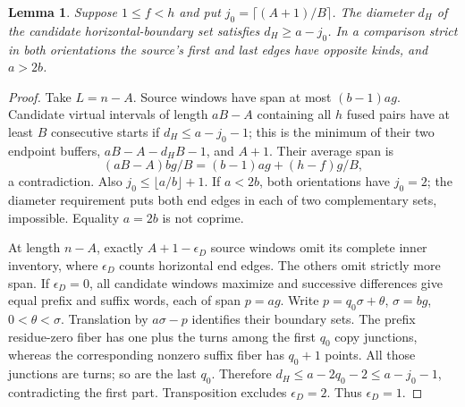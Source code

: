 \documentclass[11pt,a4paper]{amsart}
\numberwithin{equation}{section}
\theoremstyle{plain}
\newtheorem{lemma}[theorem]{Lemma}
\theoremstyle{definition}
\begin{document}
\begin{lemma}\label{lem:end-spread}
Suppose \(1\le f<h\) and put \(j_0=\lceil(A+1)/B\rceil\).  The diameter \(d_H\) of the candidate horizontal-boundary set satisfies \(d_H\ge a-j_0\).  In a comparison strict in both orientations the source's first and last edges have opposite kinds, and \(a>2b\).
\end{lemma}
\begin{proof}
Take \(L=n-A\).  Source windows have span at most \((b-1)ag\).  Candidate virtual intervals of length \(aB-A\) containing all \(h\) fused pairs have at least \(B\) consecutive starts if \(d_H\le a-j_0-1\); this is the minimum of their two endpoint buffers, \(aB-A-d_HB-1\), and \(A+1\).  Their average span is
\[
 (aB-A)bg/B=(b-1)ag+(h-f)g/B,
\]
a contradiction.  Also \(j_0\le\lfloor a/b\rfloor+1\).  If \(a<2b\), both orientations have \(j_0=2\); the diameter requirement puts both end edges in each of two complementary sets, impossible.  Equality \(a=2b\) is not coprime.

At length \(n-A\), exactly \(A+1-\epsilon_D\) source windows omit its complete inner inventory, where \(\epsilon_D\) counts horizontal end edges.  The others omit strictly more span.  If \(\epsilon_D=0\), all candidate windows maximize and successive differences give equal prefix and suffix words, each of span \(p=ag\).  Write \(p=q_0\sigma+\theta\), \(\sigma=bg\), \(0<\theta<\sigma\).  Translation by \(a\sigma-p\) identifies their boundary sets.  The prefix residue-zero fiber has one plus the turns among the first \(q_0\) copy junctions, whereas the corresponding nonzero suffix fiber has \(q_0+1\) points.  All those junctions are turns; so are the last \(q_0\).  Therefore \(d_H\le a-2q_0-2\le a-j_0-1\), contradicting the first part.  Transposition excludes \(\epsilon_D=2\).  Thus \(\epsilon_D=1\).
\end{proof}
\end{document}
